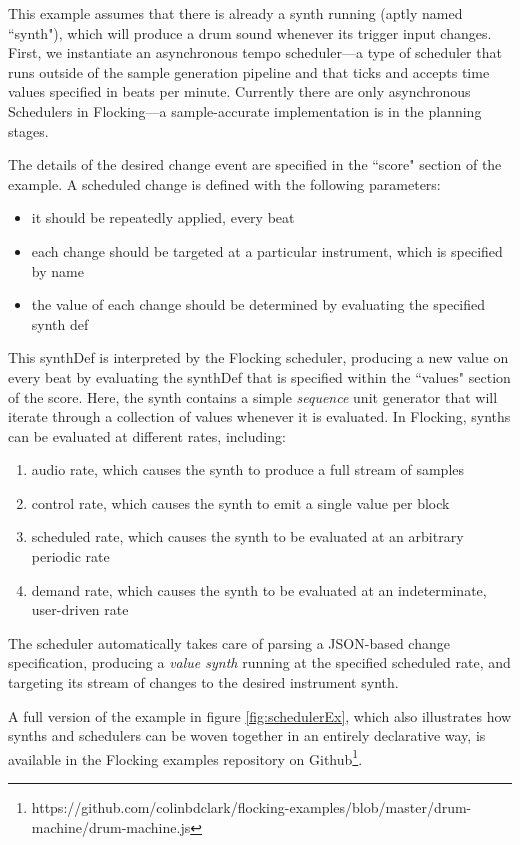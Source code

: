\documentclass{article}
\begin{document}
This example assumes that there is already a synth running (aptly named ``synth"), which will produce a drum sound whenever its trigger input changes. First, we instantiate an asynchronous tempo scheduler---a type of scheduler that runs outside of the sample generation pipeline and that ticks and accepts time values specified in beats per minute. Currently there are only asynchronous Schedulers in Flocking---a sample-accurate implementation is in the planning stages.

The details of the desired change event are specified in the ``score" section of the example. A scheduled change is defined with the following parameters:

\begin{itemize}
\item it should be repeatedly applied, every beat
\item each change should be targeted at a particular instrument, which is specified by name
\item the value of each change should be determined by evaluating the specified synth def
\end{itemize}

This synthDef is interpreted by the Flocking scheduler, producing a new value on every beat by evaluating the synthDef that is specified within the ``values" section of the score. Here, the synth contains a simple {\it sequence} unit generator that will iterate through a collection of values whenever it is evaluated. In Flocking, synths can be evaluated at different rates, including:

\begin{enumerate}
\item audio rate, which causes the synth to produce a full stream of samples
\item control rate, which causes the synth to emit a single value per block
\item scheduled rate, which causes the synth to be evaluated at an arbitrary periodic rate
\item demand rate, which causes the synth to be evaluated at an indeterminate, user-driven rate
\end{enumerate}

The scheduler automatically takes care of parsing a JSON-based change specification, producing a {\it value synth} running at the specified scheduled rate, and targeting its stream of changes to the desired instrument synth.

A full version of the example in figure \ref{fig:schedulerEx}, which also illustrates how synths and schedulers can be woven together in an entirely declarative way, is available in the Flocking examples repository on Github\footnote{https://github.com/colinbdclark/flocking-examples/blob/master/drum-machine/drum-machine.js}.
\end{document}
